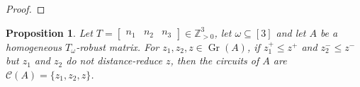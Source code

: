 \documentclass[a4paper, 12pt]{article}
\newcommand{\NN}{\mathbb N}
\newcommand{\ZZ}{\mathbb Z}
\theoremstyle{plain}
\newtheorem{proposition}[theorem]{Proposition}
\newtheorem{corollary}[theorem]{Corollary}
\theoremstyle{definition}
\theoremstyle{remark}
\begin{document}
\begin{proof}
\end{proof}







\begin{proposition} \label{prop:allcircuits}
    Let $T=\begin{bmatrix}
        n_1 & n_2 & n_3
    \end{bmatrix} \in  \ZZ_{>0}^3$, let $\omega \subseteq [3]$ and let $A$ be a homogeneous $T_{\omega}$-robust matrix. For $z_1,z_2,z \in \operatorname{Gr}(A)$, if $z_1^+ \le z^+$ and $z_2^- \le z^-$ but $z_1$ and $z_2$ do not distance-reduce $z$, then the circuits of $A$ are $\mathcal{C}(A)=\{z_1,z_2,z\}$.
\end{proposition}
     
\end{document}
